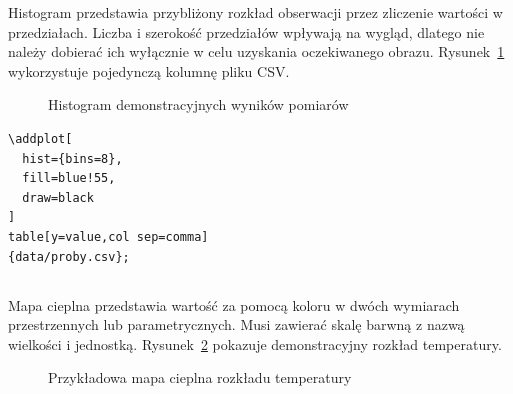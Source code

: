 Histogram przedstawia przybliżony rozkład obserwacji przez zliczenie wartości w przedziałach. Liczba i szerokość przedziałów wpływają na wygląd, dlatego nie należy dobierać ich wyłącznie w celu uzyskania oczekiwanego obrazu. Rysunek~\ref{fig:histogram} wykorzystuje pojedynczą kolumnę pliku CSV.

\begin{figure}[htbp]
  \centering
  \caption{Histogram demonstracyjnych wyników pomiarów}
  \label{fig:histogram}
\end{figure}

\begin{lstlisting}[caption={\ploren{Histogram danych z pliku CSV}{Histogram of data from a CSV file}}]
\addplot[
  hist={bins=8},
  fill=blue!55,
  draw=black
]
table[y=value,col sep=comma]
{data/proby.csv};
\end{lstlisting}

\subsection{}

Mapa cieplna przedstawia wartość za pomocą koloru w dwóch wymiarach przestrzennych lub parametrycznych. Musi zawierać skalę barwną z nazwą wielkości i jednostką. Rysunek~\ref{fig:mapa-cieplna} pokazuje demonstracyjny rozkład temperatury.

\begin{figure}[htbp]
  \centering
  \caption{Przykładowa mapa cieplna rozkładu temperatury}
  \label{fig:mapa-cieplna}
\end{figure}

